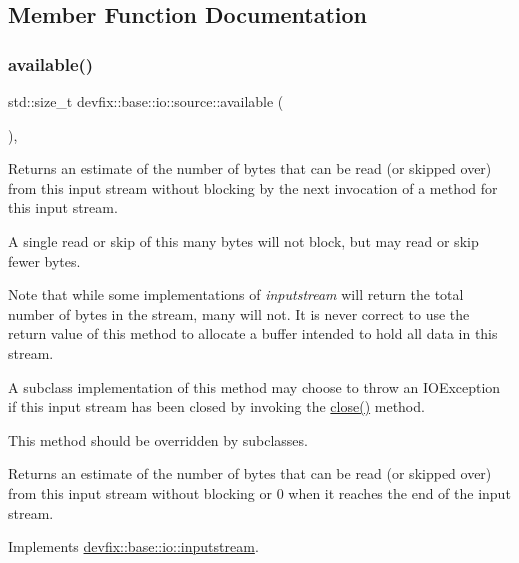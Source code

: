 \subsection{Member Function Documentation}
\mbox{\label{structdevfix_1_1base_1_1io_1_1source_a911f4ba79499a623de30cf16d3d26d47}} 
\subsubsection{\texorpdfstring{available()}{available()}}
{\footnotesize\ttfamily std\+::size\+\_\+t devfix\+::base\+::io\+::source\+::available (\begin{DoxyParamCaption}{ }\end{DoxyParamCaption})\hspace{0.3cm}{\ttfamily [override]}, {\ttfamily [virtual]}}



Returns an estimate of the number of bytes that can be read (or skipped over) from this input stream without blocking by the next invocation of a method for this input stream. 

A single read or skip of this many bytes will not block, but may read or skip fewer bytes.

Note that while some implementations of {\itshape inputstream} will return the total number of bytes in the stream, many will not. It is never correct to use the return value of this method to allocate a buffer intended to hold all data in this stream.

A subclass\textquotesingle{} implementation of this method may choose to throw an I\+O\+Exception if this input stream has been closed by invoking the \hyperlink{structdevfix_1_1base_1_1io_1_1source_aa00a381c8a166cbbc5dbf6de4b56590e}{close()} method.

This method should be overridden by subclasses.

\begin{DoxyReturn}{Returns}
an estimate of the number of bytes that can be read (or skipped over) from this input stream without blocking or 0 when it reaches the end of the input stream. 
\end{DoxyReturn}


Implements \hyperlink{structdevfix_1_1base_1_1io_1_1inputstream_ace04813af676b6c81fa452eb4d81a796}{devfix\+::base\+::io\+::inputstream}.


